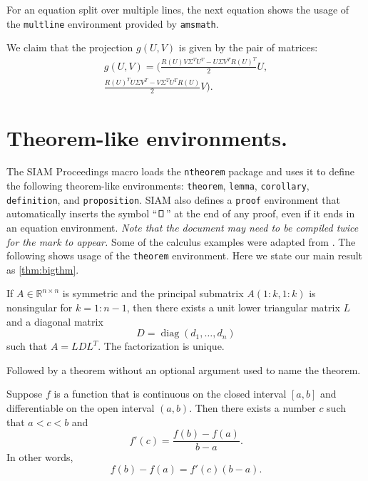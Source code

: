 \documentclass[twoside,leqno,twocolumn]{article}
\DeclareMathOperator{\diag}{diag}
\begin{document}
For an equation split over multiple lines, the next equation shows the
usage of the \texttt{multline} environment provided by \texttt{amsmath}.

We claim that the projection $g(U,V)$ is given by the pair of matrices:
\begin{multline} \label{eq:ml}
  g(U,V) = \biggl( \frac{R(U)V\Sigma^{T}U^{T} 
    - U\Sigma V^{T}R(U)^{T}}{2}U,\\
  \frac{R(U)^{T}U\Sigma V^{T}-V \Sigma^{T}U^{T}R(U)}{2}V \biggr).
\end{multline}

\section{Theorem-like environments.}
\label{sec:thm}
The SIAM Proceedings macro loads the \texttt{ntheorem} package and uses it to define the following
theorem-like environments:
\texttt{theorem}, 
\texttt{lemma}, 
\texttt{corollary},
\texttt{definition}, and
\texttt{proposition}.
SIAM also defines a \texttt{proof} environment that automatically
inserts the symbol ``$\,\proofbox\,$'' at the end of any proof, even if it ends in an
equation environment. \emph{Note that the document may need to be
  compiled twice for the mark to appear.}
Some of the calculus examples were adapted from \cite{CalcI}. 
%
%
The following shows usage of the \texttt{theorem} environment. 
Here we state our main result as \cref{thm:bigthm}.

\begin{theorem}\label{thm:bigthm}
  If $A \in \mathbb{R}^{n \times n}$ is symmetric and the principal
  submatrix $A(1:k,1:k)$ is nonsingular for $k=1:n-1$, then there
  exists a unit lower triangular matrix $L$ and a diagonal matrix
  \begin{displaymath}
    D = \diag(d_1,\dots,d_n)
  \end{displaymath}
  such that $A=LDL^T$. The factorization is unique.
\end{theorem}

Followed by a theorem without an optional argument used to name the theorem.

\begin{theorem}\label{thm:mvt}
  Suppose $f$ is a function that is continuous on the closed interval
  $[a,b]$ and differentiable on the open interval $(a,b)$.
  Then there exists a number $c$ such that $a < c < b$ and
  \begin{displaymath}
    f'(c) = \frac{f(b)-f(a)}{b-a}.
  \end{displaymath}
  In other words,
  \begin{displaymath}
    f(b)-f(a) = f'(c)(b-a).
  \end{displaymath}
\end{theorem}
\end{document}
